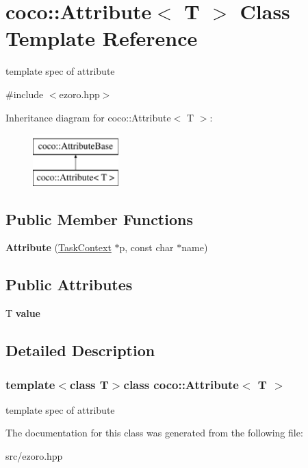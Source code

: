 \hypertarget{classcoco_1_1_attribute}{\section{coco\-:\-:Attribute$<$ T $>$ Class Template Reference}
\label{classcoco_1_1_attribute}
}


template spec of attribute  




{\ttfamily \#include $<$ezoro.\-hpp$>$}

Inheritance diagram for coco\-:\-:Attribute$<$ T $>$\-:\begin{figure}[H]
\begin{center}
\leavevmode
\includegraphics[height=2.000000cm]{classcoco_1_1_attribute}
\end{center}
\end{figure}
\subsection*{Public Member Functions}
\begin{DoxyCompactItemize}
\item 
\hypertarget{classcoco_1_1_attribute_af9a9f4eacf20c9cc652672aacd15979a}{{\bfseries Attribute} (\hyperlink{classcoco_1_1_task_context}{Task\-Context} $\ast$p, const char $\ast$name)}\label{classcoco_1_1_attribute_af9a9f4eacf20c9cc652672aacd15979a}

\end{DoxyCompactItemize}
\subsection*{Public Attributes}
\begin{DoxyCompactItemize}
\item 
\hypertarget{classcoco_1_1_attribute_ab47107ba1c568152b41d490c41cad0a1}{T {\bfseries value}}\label{classcoco_1_1_attribute_ab47107ba1c568152b41d490c41cad0a1}

\end{DoxyCompactItemize}


\subsection{Detailed Description}
\subsubsection*{template$<$class T$>$class coco\-::\-Attribute$<$ T $>$}

template spec of attribute 

The documentation for this class was generated from the following file\-:\begin{DoxyCompactItemize}
\item 
src/ezoro.\-hpp\end{DoxyCompactItemize}
